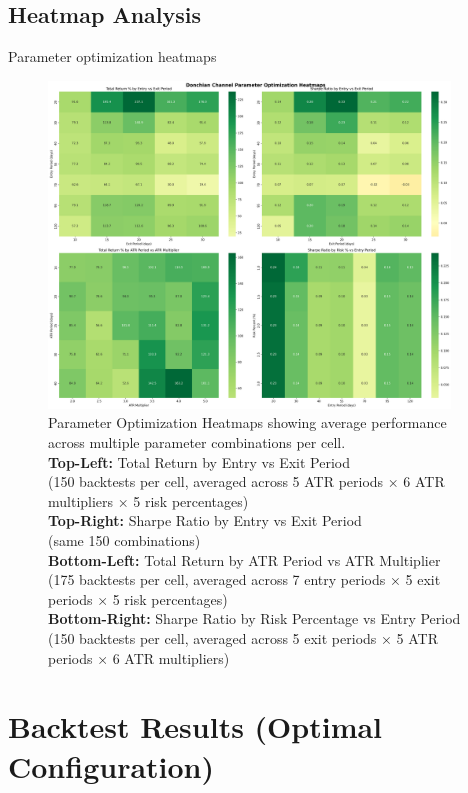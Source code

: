 \documentclass[11pt,a4paper]{article}
\begin{document}
\subsection{Heatmap Analysis}
Parameter optimization heatmaps
\begin{figure}[H]
\centering
\includegraphics[width=0.95\textwidth]{donchian_optimization_heatmaps.png}
\caption{Parameter Optimization Heatmaps showing average performance across multiple parameter combinations per cell.
\\[0.2cm]
\textbf{Top-Left:} Total Return by Entry vs Exit Period\\
(150 backtests per cell, averaged across 5 ATR periods × 6 ATR multipliers × 5 risk percentages)
\\[0.2cm]
\textbf{Top-Right:} Sharpe Ratio by Entry vs Exit Period\\
(same 150 combinations)
\\[0.2cm] 
\textbf{Bottom-Left:} Total Return by ATR Period vs ATR Multiplier\\
(175 backtests per cell, averaged across 7 entry periods × 5 exit periods × 5 risk percentages)
\\[0.2cm]
\textbf{Bottom-Right:} Sharpe Ratio by Risk Percentage vs Entry Period\\
(150 backtests per cell, averaged across 5 exit periods × 5 ATR periods × 6 ATR multipliers)
\\[0.2cm]
}
\label{fig:heatmaps}
\end{figure}

\section{Backtest Results (Optimal Configuration)}
\end{document}

